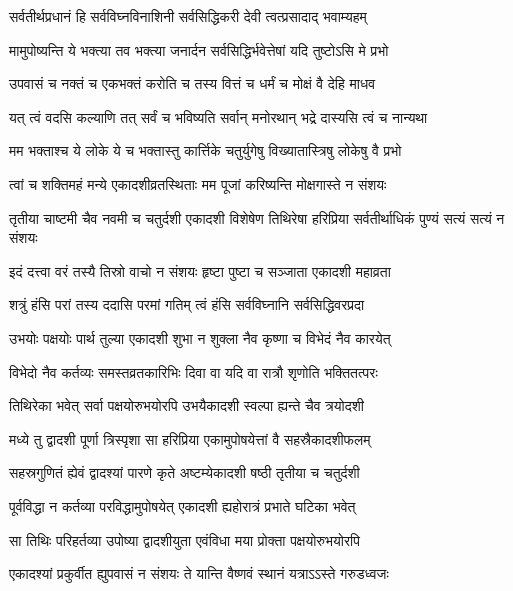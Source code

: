 \twolineshloka
{सर्वतीर्थप्रधानं हि सर्वविघ्नविनाशिनी}
{सर्वसिद्धिकरी देवी त्वत्प्रसादाद् भवाम्यहम्}%

\twolineshloka
{मामुपोष्यन्ति ये भक्त्या तव भक्त्या जनार्दन}
{सर्वसिद्धिर्भवेत्तेषां यदि तुष्टोऽसि मे प्रभो}%

\twolineshloka
{उपवासं च नक्तं च एकभक्तं करोति च}
{तस्य वित्तं च धर्मं च मोक्षं वै देहि माधव}%


\twolineshloka
{यत् त्वं वदसि कल्याणि तत् सर्वं च भविष्यति}
{सर्वान् मनोरथान् भद्रे दास्यसि त्वं च नान्यथा}%

\twolineshloka
{मम भक्ताश्च ये लोके ये च भक्तास्तु कार्त्तिके}
{चतुर्युगेषु विख्यातास्त्रिषु लोकेषु वै प्रभो}%

\twolineshloka
{त्वां च शक्तिमहं मन्ये एकादशीव्रतस्थिताः}
{मम पूजां करिष्यन्ति मोक्षगास्ते न संशयः}%

\threelineshloka
{तृतीया चाष्टमी चैव नवमी च चतुर्दशी}
{एकादशी विशेषेण तिथिरेषा हरिप्रिया}
{सर्वतीर्थाधिकं पुण्यं सत्यं सत्यं न संशयः}%

\twolineshloka
{इदं दत्त्वा वरं तस्यै तिस्रो वाचो न संशयः}
{हृष्टा पुष्टा च सञ्जाता एकादशी महाव्रता}%

\twolineshloka
{शत्रुं हंसि परां तस्य ददासि परमां गतिम्}
{त्वं हंसि सर्वविघ्नानि सर्वसिद्धिवरप्रदा}%

\twolineshloka
{उभयोः पक्षयोः पार्थ तुल्या एकादशी शुभा}
{न शुक्ला नैव कृष्णा च विभेदं नैव कारयेत्}%

\twolineshloka
{विभेदो नैव कर्तव्यः समस्तव्रतकारिभिः}
{दिवा वा यदि वा रात्रौ शृणोति भक्तितत्परः}%

\twolineshloka
{तिथिरेका भवेत् सर्वा पक्षयोरुभयोरपि}
{उभयैकादशी स्वल्पा ह्यन्ते चैव त्रयोदशी}%

\twolineshloka
{मध्ये तु द्वादशी पूर्णा त्रिस्पृशा सा हरिप्रिया}
{एकामुपोषयेत्तां वै सहस्रैकादशीफलम्}%

\twolineshloka
{सहस्रगुणितं ह्येवं द्वादश्यां पारणे कृते}
{अष्टम्येकादशी षष्ठी तृतीया च चतुर्दशी}%

\twolineshloka
{पूर्वविद्धा न कर्तव्या परविद्धामुपोषयेत्}
{एकादशी ह्यहोरात्रं प्रभाते घटिका भवेत्}%

\twolineshloka
{सा तिथिः परिहर्तव्या उपोष्या द्वादशीयुता}
{एवंविधा मया प्रोक्ता पक्षयोरुभयोरपि}%

\twolineshloka
{एकादश्यां प्रकुर्वीत ह्युपवासं न संशयः}
{ते यान्ति वैष्णवं स्थानं यत्राऽऽस्ते गरुडध्वजः}%

